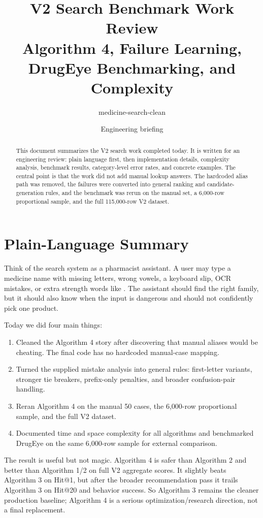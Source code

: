 \documentclass[11pt]{article}
\title{\textbf{V2 Search Benchmark Work Review}\\
\large Algorithm 4, Failure Learning, DrugEye Benchmarking, and Complexity}
\author{medicine-search-clean}
\date{Engineering briefing}
\newcommand{\id}[1]{\texttt{\expandafter\seqsplit\expandafter{\detokenize{#1}}}}
\begin{document}
\maketitle

\begin{abstract}
This document summarizes the V2 search work completed today. It is written for
an engineering review: plain language first, then implementation details,
complexity analysis, benchmark results, category-level error rates, and concrete
examples. The central point is that the work did not add manual lookup answers.
The hardcoded alias path was removed, the failures were converted into general
ranking and candidate-generation rules, and the benchmark was rerun on the
manual set, a 6,000-row proportional sample, and the full 115,000-row V2
dataset.
\end{abstract}

\section{Plain-Language Summary}

Think of the search system as a pharmacist assistant. A user may type a medicine
name with missing letters, wrong vowels, a keyboard slip, OCR mistakes, or extra
strength words like \id{500mg}. The assistant should find the right family, but
it should also know when the input is dangerous and should not confidently pick
one product.

Today we did four main things:

\begin{enumerate}
  \item Cleaned the Algorithm 4 story after discovering that manual aliases
        would be cheating. The final code has no hardcoded manual-case mapping.
  \item Turned the supplied mistake analysis into general rules: first-letter
        variants, stronger tie breakers, prefix-only penalties, and broader
        confusion-pair handling.
  \item Reran Algorithm 4 on the manual 50 cases, the 6,000-row proportional
        sample, and the full V2 dataset.
  \item Documented time and space complexity for all algorithms and benchmarked
        DrugEye on the same 6,000-row sample for external comparison.
\end{enumerate}

The result is useful but not magic. Algorithm 4 is safer than Algorithm 2 and
better than Algorithm 1/2 on full V2 aggregate scores. It slightly beats
Algorithm 3 on Hit@1, but after the broader recommendation pass it trails
Algorithm 3 on Hit@20 and behavior success. So Algorithm 3 remains the cleaner
production baseline; Algorithm 4 is a serious optimization/research direction,
not a final replacement.
\end{document}
